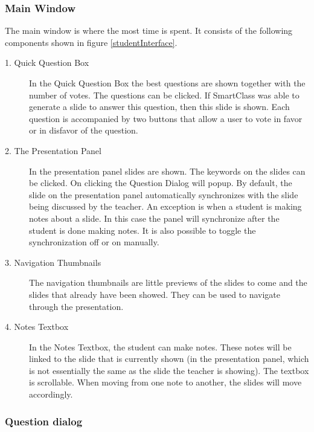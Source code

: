 \documentclass[11pt]{article}
\begin{document}
\subsubsection{Main Window}
The main window is where the most time is spent. It consists of the following components shown in figure \ref{studentInterface}.
\begin{description}
\item[1. Quick Question Box] In the Quick Question Box the best questions are shown together with the number of votes. The questions can be clicked. If SmartClass was able to generate a slide to answer this question, then this slide is shown. Each question is accompanied by two buttons that allow a user to vote in favor or in disfavor of the question. 
\item[2. The Presentation Panel] In the presentation panel slides are shown. The keywords on the slides can be clicked. On clicking the Question Dialog will popup. By default, the slide on the presentation panel automatically synchronizes with the slide being discussed by the teacher. An exception is when a student is making notes about a slide. In this case the panel will synchronize after the student is done making notes. It is also possible to toggle the synchronization off or on manually.  
\item[3. Navigation Thumbnails] The navigation thumbnails are little previews of the slides to come and the slides that already have been showed. They can be used to navigate through the presentation.
\item[4. Notes Textbox] In the Notes Textbox, the student can make notes. These notes will be linked to the slide that is currently shown (in the presentation panel, which is not essentially the same as the slide the teacher is showing). The textbox is scrollable. When moving from one note to another, the slides will move accordingly. 
\end{description}

\subsubsection{Question dialog}
\end{document}
